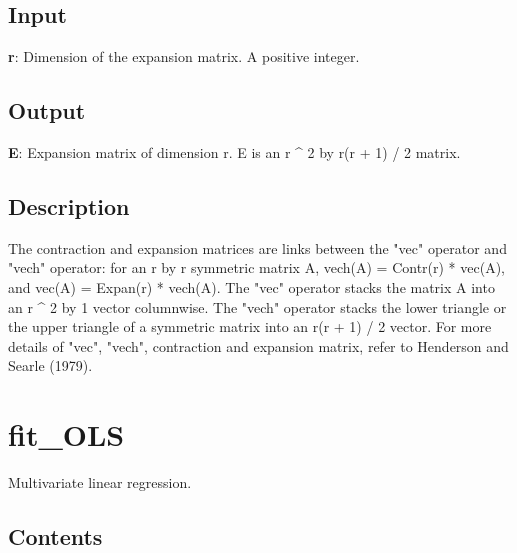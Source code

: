 \documentclass[a4paper,11pt,openany]{memoir}
\begin{document}
\subsection*{Input}

\begin{par}
\textbf{r}: Dimension of the expansion matrix.  A positive integer.
\end{par} \vspace{1em}


\subsection*{Output}

\begin{par}
\textbf{E}: Expansion matrix of dimension r.  E is an r \^{} 2 by r(r + 1) / 2 matrix.
\end{par} \vspace{1em}


\subsection*{Description}

\begin{par}
The contraction and expansion matrices are links between the "vec" operator and "vech" operator: for an r by r symmetric matrix A, vech(A) = Contr(r) * vec(A), and vec(A) = Expan(r) * vech(A). The "vec" operator stacks the matrix A into an r \^{} 2 by 1 vector columnwise.  The "vech" operator stacks the lower triangle or the upper triangle of a symmetric matrix into an r(r + 1) / 2 vector. For more details of "vec", "vech", contraction and expansion matrix, refer to Henderson and Searle (1979).
\end{par} \vspace{1em}

\newpage

\rmfamily
\color{black}\section{fit\_OLS}

\begin{par}
Multivariate linear regression.
\end{par} \vspace{1em}

\subsection*{Contents}
\end{document}

